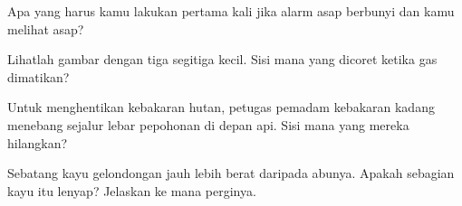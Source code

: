 \begin{exercise}[$\star$]\label{exo:g4:what-a-fire-needs:8}
Apa yang harus kamu lakukan pertama kali jika alarm asap berbunyi dan
kamu melihat asap?
\end{exercise}

\begin{exercise}[$\star$]\label{exo:g4:what-a-fire-needs:9}
Lihatlah gambar dengan tiga segitiga kecil. Sisi mana yang dicoret
ketika gas dimatikan?
\end{exercise}

\begin{exercise}[$\star\star$]\label{exo:g4:what-a-fire-needs:10}
Untuk menghentikan kebakaran hutan, petugas pemadam kebakaran kadang
menebang sejalur lebar pepohonan di depan api. Sisi  mana
yang mereka hilangkan?
\end{exercise}

\begin{exercise}[$\star\star$]\label{exo:g4:what-a-fire-needs:11}
Sebatang kayu gelondongan jauh lebih berat daripada abunya. Apakah
sebagian kayu itu lenyap? Jelaskan ke mana perginya.
\end{exercise}
